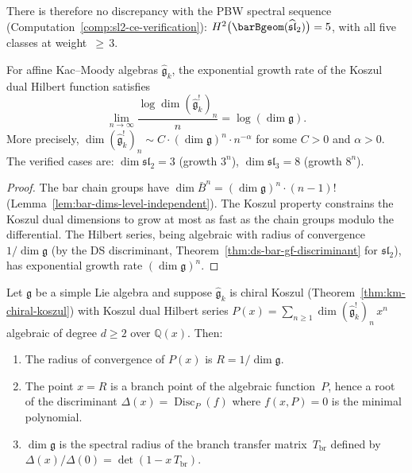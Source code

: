 \begin{lemma}
There is therefore no discrepancy with the PBW spectral sequence
(Computation~\ref{comp:sl2-ce-verification}):
$H^2\bigl(\barBgeom(\widehat{\mathfrak{sl}}_2)\bigr) = 5$,
with all five classes at weight~${\geq}\, 3$.
\end{lemma}

\begin{corollary}
\label{cor:growth-rate-dimg}
For affine Kac--Moody algebras $\widehat{\mathfrak{g}}_k$, the exponential growth rate of the Koszul dual Hilbert function satisfies
\[
\lim_{n \to \infty} \frac{\log \dim (\widehat{\mathfrak{g}}_k^!)_n}{n} = \log(\dim \mathfrak{g}).
\]
More precisely, $\dim (\widehat{\mathfrak{g}}_k^!)_n \sim C \cdot (\dim \mathfrak{g})^n \cdot n^{-\alpha}$ for some $C > 0$ and $\alpha > 0$.  The verified cases are: $\dim \mathfrak{sl}_2 = 3$ (growth $3^n$), $\dim \mathfrak{sl}_3 = 8$ (growth $8^n$).
\end{corollary}

\begin{proof}
The bar chain groups have $\dim \bar{B}^n = (\dim \mathfrak{g})^n \cdot (n{-}1)!$ (Lemma~\ref{lem:bar-dims-level-independent}).  The Koszul property constrains the Koszul dual dimensions to grow at most as fast as the chain groups modulo the differential.  The Hilbert series, being algebraic with radius of convergence $1/\dim\mathfrak{g}$ (by the DS discriminant, Theorem~\ref{thm:ds-bar-gf-discriminant} for $\mathfrak{sl}_2$), has exponential growth rate $(\dim \mathfrak{g})^n$.
\end{proof}

\begin{theorem}
\label{thm:dominant-branch-point}
Let $\mathfrak{g}$ be a simple Lie algebra and suppose
$\widehat{\mathfrak{g}}_k$ is chiral Koszul
\textup{(}Theorem~\textup{\ref{thm:km-chiral-koszul})} with
Koszul dual Hilbert series
$P(x) = \sum_{n \geq 1} \dim(\widehat{\mathfrak{g}}_k^!)_n\, x^n$
algebraic of degree $d \geq 2$ over $\mathbb{Q}(x)$.  Then:
\begin{enumerate}[label=\textup{(\roman*)}]
\item The radius of convergence of $P(x)$ is
  $R = 1/\dim\mathfrak{g}$.
\item The point $x = R$ is a branch point of the algebraic
  function~$P$, hence a root of the discriminant
  $\Delta(x) = \operatorname{Disc}_P(f)$ where
  $f(x,P) = 0$ is the minimal polynomial.
\item $\dim\mathfrak{g}$ is the spectral radius of the branch
  transfer matrix~$T_{\mathrm{br}}$ defined by
  $\Delta(x)/\Delta(0) = \det(1 - x\,T_{\mathrm{br}})$.
\end{enumerate}
\end{theorem}

